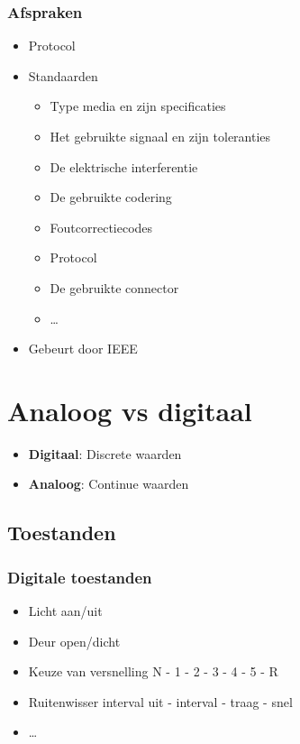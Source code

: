 \documentclass{article}
\newcommand{\bold}[1]{\textbf{#1}}
\begin{document}
\subsubsection{Afspraken}
\begin{itemize}
    \item Protocol
    \item Standaarden
    \begin{itemize}
        \item Type media en zijn specificaties
        \item Het gebruikte signaal en zijn toleranties
        \item De elektrische interferentie
        \item De gebruikte codering
        \item Foutcorrectiecodes
        \item Protocol
        \item De gebruikte connector
        \item \dots
    \end{itemize}
    \item Gebeurt door IEEE
\end{itemize}

\section{Analoog vs digitaal}
\begin{itemize}
    \item \bold{Digitaal}: Discrete waarden
    \item \bold{Analoog}: Continue waarden
\end{itemize}
\subsection{Toestanden}
\subsubsection{Digitale toestanden}
\begin{itemize}
    \item Licht aan/uit
    \item Deur open/dicht
    \item Keuze van versnelling N - 1 - 2 - 3 - 4 - 5 - R
    \item Ruitenwisser interval uit - interval - traag - snel
    \item \dots
\end{itemize}
\end{document}
